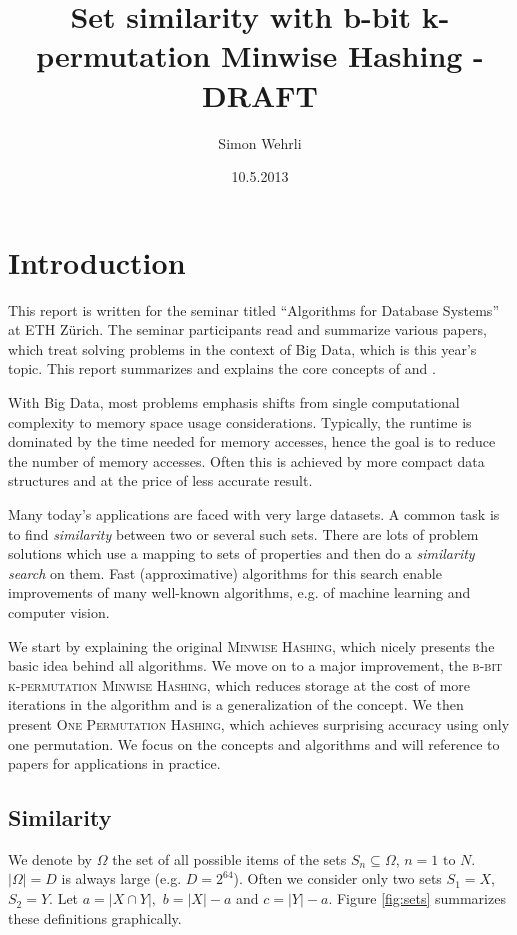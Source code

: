 \documentclass[a4paper]{article}
\author{Simon Wehrli}
\date{10.5.2013}
\title{Set similarity with b-bit k-permutation Minwise Hashing - DRAFT}
\begin{document}
 
\maketitle

\section{Introduction}
This report is written for the seminar titled ``Algorithms for Database Systems'' at ETH Z\"{u}rich. The seminar participants read and summarize various papers, which treat solving problems in the context of Big Data, which is this year's topic. This report summarizes and explains the core concepts of \citep{LiK11} and \citep{LiOwZhang12}.

With Big Data, most problems emphasis shifts from single computational complexity to memory space usage considerations. Typically, the runtime is dominated by the time needed for memory accesses, hence the goal is to reduce the number of memory accesses. Often this is achieved by more compact data structures and at the price of less accurate result.

Many today's applications are faced with very large datasets. A common task is to find \emph{similarity} between two or several such sets. There are lots of problem solutions which use a mapping to sets of properties and then do a \emph{similarity search} on them. Fast (approximative) algorithms for this search enable improvements of many well-known algorithms, e.g. of machine learning and computer vision.

We start by explaining the original \textsc{Minwise Hashing}, which nicely presents the basic idea behind all algorithms. We move on to a major improvement, the \textsc{b-bit k-permutation Minwise Hashing}, which reduces storage at the cost of more iterations in the algorithm and is a generalization of the concept. We then present \textsc{One Permutation Hashing}, which achieves surprising accuracy using only one permutation. We focus on the concepts and algorithms and will reference to papers for applications in practice.


\subsection{Similarity}
We denote by $\Omega$ the set of all possible items of the sets $S_n \subseteq \Omega$, $n = 1 \text{ to } N$. $\left| \Omega \right| = D$ is always large (e.g. $D=2^{64}$). Often we consider only two sets $S_1 = X$, $S_2 = Y$. Let $a=|X \cap Y|,$ $b=|X|-a$ and $c=|Y|-a$. Figure \vref{fig:sets} summarizes these definitions graphically.
\end{document}

